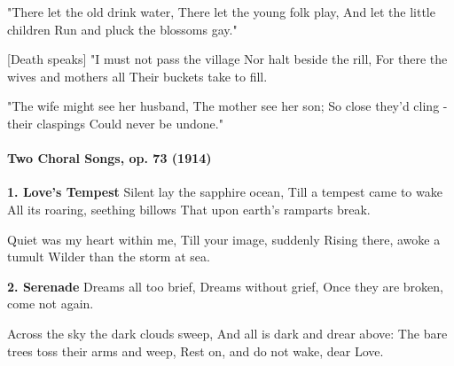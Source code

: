 \documentclass[11pt, ngermanm, titlepage]{article}
\begin{document}
\begin{multicols}{2}
	"There let the old drink water,\newline
	There let the young folk play,\newline
	And let the little children\newline
	Run and pluck the blossoms gay."\newline
	
	[Death speaks]\newline
	"I must not pass the village\newline
	Nor halt beside the rill,\newline
	For there the wives and mothers all\newline
	Their buckets take to fill.\newline
	
	"The wife might see her husband,\newline
	The mother see her son;\newline
	So close they'd cling - their claspings\newline
	Could never be undone."\newline
	
	\paragraph{Two Choral Songs, op. 73 (1914)\newline}
	\textbf{1. Love’s Tempest}\newline
	Silent lay the sapphire ocean,\newline
	Till a tempest came to wake\newline
	All its roaring, seething billows\newline
	That upon earth's ramparts break.\newline
	
	Quiet was my heart within me\newline,
	Till your image, suddenly\newline
	Rising there, awoke a tumult\newline
	Wilder than the storm at sea.\newline
	
	\textbf{2. Serenade}\newline
	Dreams all too brief,\newline
	Dreams without grief,\newline
	Once they are broken, come not again.\newline
	
	Across the sky the dark clouds sweep,\newline
	And all is dark and drear above:\newline
	The bare trees toss their arms and weep,\newline
	Rest on, and do not wake, dear Love.\newline
	

\end{multicols}
\end{document}
